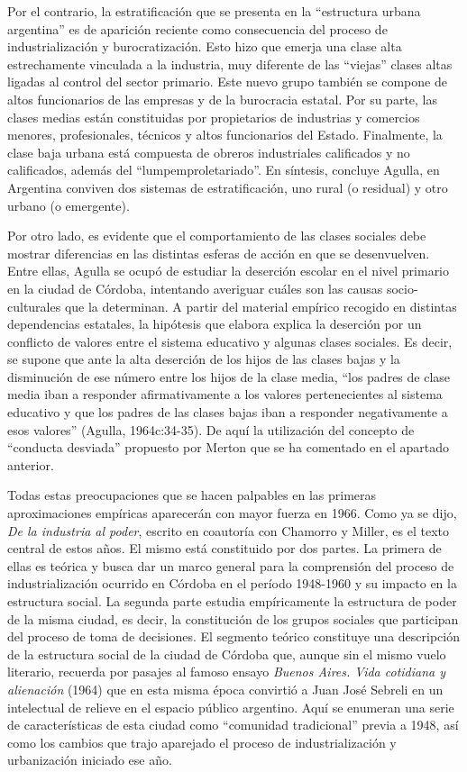 Por el contrario, la estratificación que se presenta en la \enquote{estructura urbana argentina} es de aparición reciente como consecuencia del proceso de industrialización y burocratización. Esto hizo que emerja una clase alta estrechamente vinculada a la industria, muy diferente de las \enquote{viejas} clases altas ligadas al control del sector primario. Este nuevo grupo también se compone de altos funcionarios de las empresas y de la burocracia estatal. Por su parte, las clases medias están constituidas por propietarios de industrias y comercios menores, profesionales, técnicos y altos funcionarios del Estado. Finalmente, la clase baja urbana está compuesta de obreros industriales calificados y no calificados, además del \enquote{lumpemproletariado}. En síntesis, concluye Agulla, en Argentina conviven dos sistemas de estratificación, uno rural (o residual) y otro urbano (o emergente).

Por otro lado, es evidente que el comportamiento de las clases sociales debe mostrar diferencias en las distintas esferas de acción en que se desenvuelven. Entre ellas, Agulla se ocupó de estudiar la deserción escolar en el nivel primario en la ciudad de Córdoba, intentando averiguar cuáles son las causas socio-culturales que la determinan. A partir del material empírico recogido en distintas dependencias estatales, la hipótesis que elabora explica la deserción por un conflicto de valores entre el sistema educativo y algunas clases sociales. Es decir, se supone que ante la alta deserción de los hijos de las clases bajas y la disminución de ese número entre los hijos de la clase media, \enquote{los padres de clase media iban a responder afirmativamente a los valores pertenecientes al sistema educativo y que los padres de las clases bajas iban a responder negativamente a esos valores} (Agulla, 1964c:34-35). De aquí la utilización del concepto de \enquote{conducta desviada} propuesto por Merton que se ha comentado en el apartado anterior.

Todas estas preocupaciones que se hacen palpables en las primeras aproximaciones empíricas aparecerán con mayor fuerza en 1966. Como ya se dijo, \emph{De la industria al poder}, escrito en coautoría con Chamorro y Miller, es el texto central de estos años. El mismo está constituido por dos partes. La primera de ellas es teórica y busca dar un marco general para la comprensión del proceso de industrialización ocurrido en Córdoba en el período 1948-1960 y su impacto en la estructura social. La segunda parte estudia empíricamente la estructura de poder de la misma ciudad, es decir, la constitución de los grupos sociales que participan del proceso de toma de decisiones. El segmento teórico constituye una descripción de la estructura social de la ciudad de Córdoba que, aunque sin el mismo vuelo literario, recuerda por pasajes al famoso ensayo \emph{Buenos Aires. Vida cotidiana y alienación} (1964) que en esta misma época convirtió a Juan José Sebreli en un intelectual de relieve en el espacio público argentino. Aquí se enumeran una serie de características de esta ciudad como \enquote{comunidad tradicional} previa a 1948, así como los cambios que trajo aparejado el proceso de industrialización y urbanización iniciado ese año.

